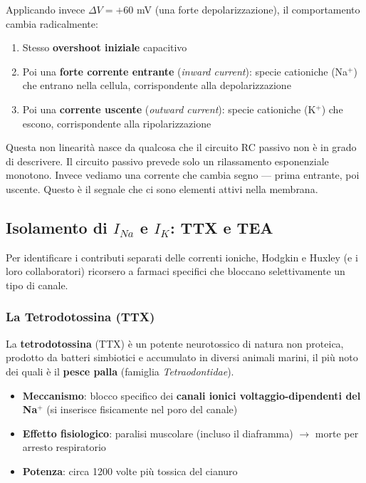 Applicando invece $\Delta V = +60$ mV (una forte depolarizzazione), il comportamento cambia radicalmente:

\begin{enumerate}
    \item Stesso \textbf{overshoot iniziale} capacitivo
    \item Poi una \textbf{forte corrente entrante} (\textit{inward current}): specie cationiche (Na$^+$) che entrano nella cellula, corrispondente alla depolarizzazione
    \item Poi una \textbf{corrente uscente} (\textit{outward current}): specie cationiche (K$^+$) che escono, corrispondente alla ripolarizzazione
\end{enumerate}

\begin{tcolorbox}[colback=gray!5, colframe=gray!40, arc=2mm, boxrule=0.5pt]
Questa non linearità nasce da qualcosa che il circuito RC passivo non è in grado di descrivere. Il circuito passivo prevede solo un rilassamento esponenziale monotono. Invece vediamo una corrente che cambia segno — prima entrante, poi uscente. Questo è il segnale che ci sono elementi attivi nella membrana.
\end{tcolorbox}


\subsection{Isolamento di $I_{Na}$ e $I_K$: TTX e TEA}


Per identificare i contributi separati delle correnti ioniche, Hodgkin e Huxley (e i loro collaboratori) ricorsero a farmaci specifici che bloccano selettivamente un tipo di canale.

\subsubsection{La Tetrodotossina (TTX)}

La \textbf{tetrodotossina} (TTX) è un potente neurotossico di natura non proteica, prodotto da batteri simbiotici e accumulato in diversi animali marini, il più noto dei quali è il \textbf{pesce palla} (famiglia \textit{Tetraodontidae}).

\begin{itemize}
    \item \textbf{Meccanismo}: blocco specifico dei \textbf{canali ionici voltaggio-dipendenti del Na$^+$} (si inserisce fisicamente nel poro del canale)
    \item \textbf{Effetto fisiologico}: paralisi muscolare (incluso il diaframma) $\rightarrow$ morte per arresto respiratorio
    \item \textbf{Potenza}: circa 1200 volte più tossica del cianuro
\end{itemize}

